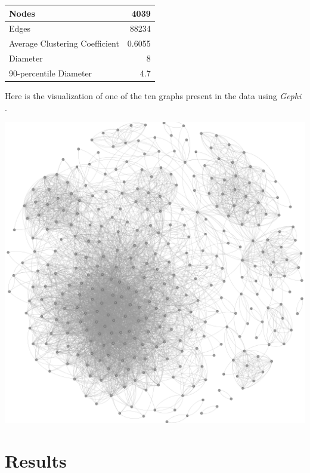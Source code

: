 \documentclass{article}
\begin{document}
        \begin{center}
            \begin{tabular}{ |l|r| }
                \hline
                Nodes & 4039 \\
                \hline
                Edges & 88234 \\
                \hline
                Average Clustering Coefficient & 0.6055 \\
                \hline
                Diameter & 8 \\
                \hline
                90-percentile Diameter & 4.7 \\
                \hline
            \end{tabular}
        \end{center}
        
        Here is the visualization of one of the ten graphs present in the data using {\em Gephi} \cite{gephi}.
        
        \begin{center}
            \includegraphics[scale=0.4]{fb0_graph.png}
        \end{center}
        
    \section{Results}
    
\end{document}
